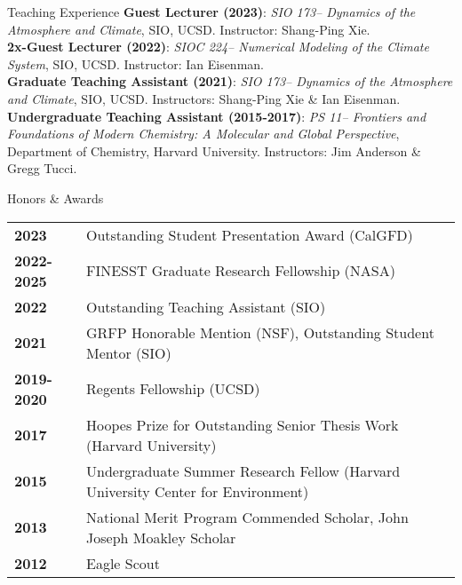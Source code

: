 \documentclass{resume} %
\begin{document}

\begin{rSection}{Teaching Experience}
\textbf{Guest Lecturer (2023)}: \textit{SIO 173-- Dynamics of the Atmosphere and Climate}, SIO, UCSD. Instructor: Shang-Ping Xie. \\ 
\textbf{2x-Guest Lecturer (2022)}: \textit{SIOC 224-- Numerical Modeling of the Climate System}, SIO, UCSD. Instructor: Ian Eisenman. \\ 
\textbf{Graduate Teaching Assistant (2021)}: \textit{SIO 173-- Dynamics of the Atmosphere and Climate}, SIO, UCSD. Instructors: Shang-Ping Xie \& Ian Eisenman.\\ 
\textbf{Undergraduate Teaching Assistant (2015-2017)}: \textit{PS 11-- Frontiers and Foundations of Modern Chemistry: A Molecular and Global Perspective}, Department of Chemistry, Harvard University. Instructors: Jim Anderson \& Gregg Tucci.

\end{rSection}


\begin{rSection}{Honors \& Awards}

\begin{tabular}{ @{} >{\bfseries}l @{\hspace{6ex}} l }
2023 & Outstanding Student Presentation Award (CalGFD) \\ 
2022-2025 & FINESST Graduate Research Fellowship (NASA) \\ 
2022 & Outstanding Teaching Assistant (SIO) \\ 
2021 & GRFP Honorable Mention (NSF), Outstanding Student Mentor (SIO)  \\
2019-2020 & Regents Fellowship (UCSD) \\ 
2017 & Hoopes Prize for Outstanding Senior Thesis Work (Harvard University) \\
2015 & Undergraduate Summer Research Fellow (Harvard University Center for Environment) \\
2013 &  National Merit Program Commended Scholar, John Joseph Moakley Scholar\\
2012 &  Eagle Scout\\
\end{tabular}

\end{rSection}
\end{document}
